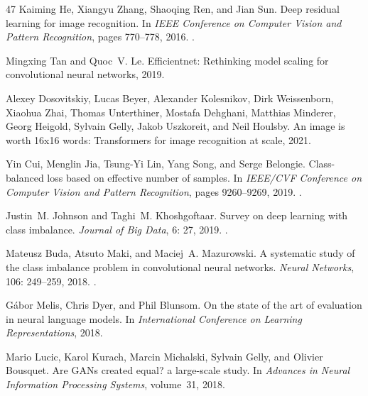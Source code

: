 \documentclass[11pt]{article}
\begin{document}
\begin{thebibliography}{47}
Kaiming He, Xiangyu Zhang, Shaoqing Ren, and Jian Sun.
\newblock Deep residual learning for image recognition.
\newblock In \emph{IEEE Conference on Computer Vision and Pattern Recognition},
  pages 770--778, 2016.
\newblock {}.

Mingxing Tan and Quoc~V. Le.
\newblock Efficientnet: Rethinking model scaling for convolutional neural
  networks, 2019.

Alexey Dosovitskiy, Lucas Beyer, Alexander Kolesnikov, Dirk Weissenborn,
  Xiaohua Zhai, Thomas Unterthiner, Mostafa Dehghani, Matthias Minderer, Georg
  Heigold, Sylvain Gelly, Jakob Uszkoreit, and Neil Houlsby.
\newblock An image is worth 16x16 words: Transformers for image recognition at
  scale, 2021.

Yin Cui, Menglin Jia, Tsung-Yi Lin, Yang Song, and Serge Belongie.
\newblock Class-balanced loss based on effective number of samples.
\newblock In \emph{IEEE/CVF Conference on Computer Vision and Pattern
  Recognition}, pages 9260--9269, 2019.
\newblock {}.

Justin~M. Johnson and Taghi~M. Khoshgoftaar.
\newblock Survey on deep learning with class imbalance.
\newblock \emph{Journal of Big Data}, 6: 27, 2019.
\newblock {}.

Mateusz Buda, Atsuto Maki, and Maciej~A. Mazurowski.
\newblock A systematic study of the class imbalance problem in convolutional
  neural networks.
\newblock \emph{Neural Networks}, 106: 249--259, 2018.
\newblock {}.

G{\'a}bor Melis, Chris Dyer, and Phil Blunsom.
\newblock On the state of the art of evaluation in neural language models.
\newblock In \emph{International Conference on Learning Representations}, 2018.

Mario Lucic, Karol Kurach, Marcin Michalski, Sylvain Gelly, and Olivier
  Bousquet.
\newblock Are {GANs} created equal? a large-scale study.
\newblock In \emph{Advances in Neural Information Processing Systems},
  volume~31, 2018.


\end{thebibliography}
\end{document}
